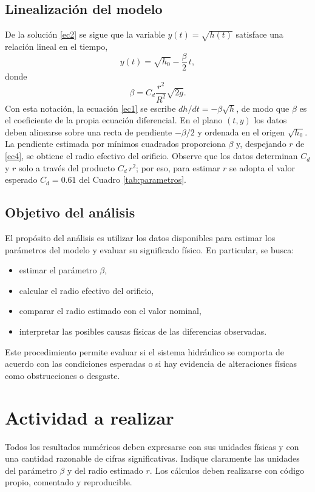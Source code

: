 \documentclass[oneside,letter,spanish,activeacute,english,links,10pt]{amcaGCS_EDO}
\begin{document}
\subsection{Linealización del modelo}
De la solución \eqref{ec2} se sigue que la variable $y(t)=\sqrt{h(t)}$ satisface una relación lineal en el tiempo,
\begin{equation}\label{ec3}
	y(t)=\sqrt{h_0}-\frac{\beta}{2}\, t ,
\end{equation}
donde
\begin{equation}\label{ec4}
	\beta= C_d \frac{r^2}{R^2} \sqrt{2 g}.
\end{equation}
Con esta notación, la ecuación \eqref{ec1} se escribe $dh/dt=-\beta\sqrt{h}$, de modo que $\beta$ es el coeficiente de la propia ecuación diferencial. En el plano $(t,y)$ los datos deben alinearse sobre una recta de pendiente $-\beta/2$ y ordenada en el origen $\sqrt{h_0}$. La pendiente estimada por mínimos cuadrados proporciona $\beta$ y, despejando $r$ de \eqref{ec4}, se obtiene el radio efectivo del orificio. Observe que los datos determinan $C_d$ y $r$ solo a través del producto $C_d\,r^2$; por eso, para estimar $r$ se adopta el valor esperado $C_d=0.61$ del Cuadro \ref{tab:parametros}.

\subsection{Objetivo del análisis}
El propósito del análisis es utilizar los datos disponibles para estimar los parámetros del modelo y evaluar su significado físico. En particular, se busca:
\begin{itemize}
	\item estimar el parámetro $\beta$,
	\item calcular el radio efectivo del orificio,
	\item comparar el radio estimado con el valor nominal,
	\item interpretar las posibles causas físicas de las diferencias observadas.
\end{itemize}
Este procedimiento permite evaluar si el sistema hidráulico se comporta de acuerdo con las condiciones esperadas o si hay evidencia de alteraciones físicas como obstrucciones o desgaste.

\section{Actividad a realizar}
Todos los resultados numéricos deben expresarse con sus unidades físicas y con una cantidad razonable de cifras significativas. Indique claramente las unidades del parámetro $\beta$ y del radio estimado $r$. Los cálculos deben realizarse con código propio, comentado y reproducible.
\end{document}

